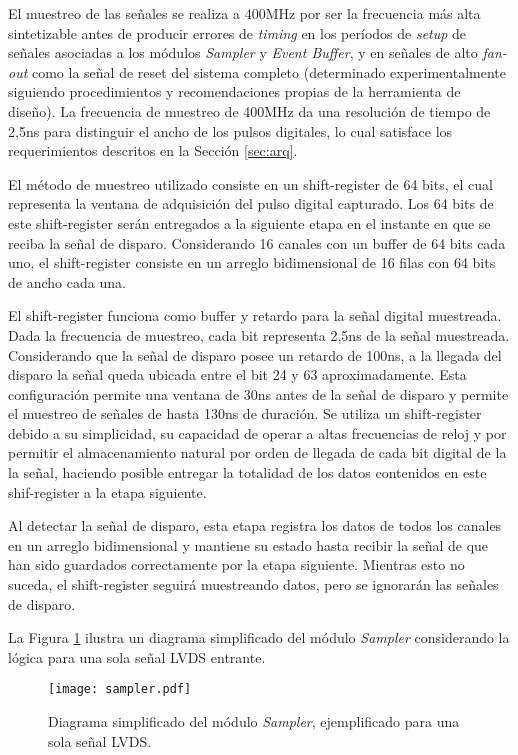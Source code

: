 	El muestreo de las señales se realiza a 400MHz por ser la frecuencia más alta sintetizable antes de producir errores de \textit{timing} en los períodos de \textit{setup} de señales asociadas a los módulos \textit{Sampler} y \textit{Event Buffer}, y en señales de alto \textit{fan-out} como la señal de reset del sistema completo (determinado experimentalmente siguiendo procedimientos y recomendaciones propias de la herramienta de diseño). La frecuencia de muestreo de 400MHz da una resolución de tiempo de 2,5ns para distinguir el ancho de los pulsos digitales, lo cual satisface los requerimientos descritos en la Sección \ref{sec:arq}.
	
	El método de muestreo utilizado consiste en un shift-register de 64 bits, el cual representa la ventana de adquisición del pulso digital capturado. Los 64 bits de este shift-register serán entregados a la siguiente etapa en el instante en que se reciba la señal de disparo. Considerando 16 canales con un buffer de 64 bits cada uno, el shift-register consiste en un arreglo bidimensional de 16 filas con 64 bits de ancho cada una.
	
	El shift-register funciona como buffer y retardo para la señal digital muestreada. Dada la frecuencia de muestreo, cada bit representa 2,5ns de la señal muestreada. Considerando que la señal de disparo posee un retardo de 100ns, a la llegada del disparo la señal queda ubicada entre el bit 24 y 63 aproximadamente. Esta configuración permite una ventana de 30ns antes de la señal de disparo y permite el muestreo de señales de hasta 130ns de duración. Se utiliza un shift-register debido a su simplicidad, su capacidad de operar a altas frecuencias de reloj y por permitir el almacenamiento natural por orden de llegada de cada bit digital de la la señal, haciendo posible entregar la totalidad de los datos contenidos en este shif-register a la etapa siguiente.
	
	Al detectar la señal de disparo, esta etapa registra los datos de todos los canales en un arreglo bidimensional y mantiene su estado hasta recibir la señal de que han sido guardados correctamente por la etapa siguiente. Mientras esto no suceda, el shift-register seguirá muestreando datos, pero se ignorarán las señales de disparo.
	
	La Figura \ref{fig:sampler} ilustra un diagrama simplificado del módulo \textit{Sampler} considerando la lógica para una sola señal LVDS entrante.
	
	\begin{figure}[H]
		\centering
		\texttt{[image: sampler.pdf]}
		\caption{Diagrama simplificado del módulo \textit{Sampler}, ejemplificado para una sola señal LVDS.}
		\label{fig:sampler}
	\end{figure}
	
